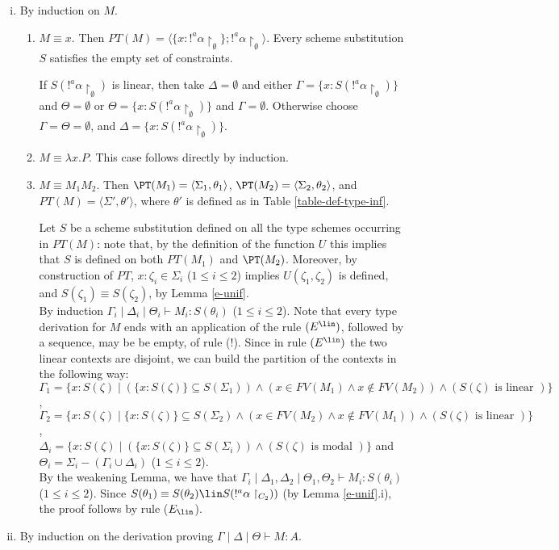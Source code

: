 \proof\hfill
\begin{enumerate}[i)] 
\item By induction on $M$.
\begin{enumerate}[$\bullet$]
\item $M \equiv x$. Then $PT(M)=\langle\{x:!^a \alpha\restriction_{\emptyset}\};
!^a \alpha\restriction_{\emptyset}\rangle$.
Every scheme substitution $S$ satisfies the empty set of constraints. 

If 
$S(!^a \alpha\restriction_{\emptyset})$ is linear, then
take $\Delta=\emptyset$ and either $\Gamma =\{x:S(!^a \alpha\restriction_{\emptyset})\}$ 
and $\Theta = \emptyset$ 
or $\Theta = \{x:S(!^a \alpha\restriction_{\emptyset})\}$ and $\Gamma =\emptyset$. 
Otherwise choose 
$\Gamma =\Theta =\emptyset$, and $\Delta=\{x:S(!^a \alpha\restriction_{\emptyset})\}$.
\item $M \equiv \lambda x.P$. This case follows directly by induction.
\item $M\equiv M_{1}M_{2}$. 
Then $\PT(M_1) = \langle \Sigma_1, \theta_{1}\rangle$, 
$\PT(M_2) = \langle \Sigma_2, \theta_{2}\rangle$, and 
$PT(M)=\langle \Sigma',\theta' \rangle $,
where $\theta' $ is defined as in Table \ref{table-def-type-inf}.

Let $S$ be a scheme substitution defined on all the type schemes occurring in $PT(M)$:
note that, by the definition of the function $U$ this implies that $S$ is defined on both $PT(M_{1})$
and $\PT(M_2)$. Moreover, by construction of $PT$, $x:\zeta_{i} \in \Sigma_{i}$ ($1 \leq i \leq 2$)
implies $U(\zeta_{1},\zeta_{2})$ is defined, and $S(\zeta_{1})\equiv S(\zeta_{2})$,
by Lemma \ref{e-unif}.\\
By induction 
$\Gamma_{i} \mid \Delta_{i} \mid \Theta_{i}\vdash M_{i}:S(\theta_{i})$
($1 \leq i \leq 2$). Note that every type derivation for $M$ ends with an application of the rule $(E^{\lin})$, followed by a sequence, 
may be be empty, of rule ($!$). Since in rule $(E^{\lin})$ the two linear contexts are disjoint, we can build the partition of the contexts in
the following way:\\
$\Gamma_{1}=\{x:S(\zeta) \mid (\{x:S(\zeta)\}\subseteq S(\Sigma_{1})) \wedge
(x\in FV(M_{1}) \wedge x\not \in FV(M_{2})) \wedge
(S(\zeta) \mbox{ is linear })\}$,\\
$\Gamma_{2}=\{x:S(\zeta) \mid \{x:S(\zeta)\}\subseteq S(\Sigma_{2}) 
\wedge (x\in FV(M_{2}) \wedge x\not \in FV(M_{1})) \wedge
(S(\zeta) \mbox{ is linear })\}$,\\
$\Delta_{i}=\{x:S(\zeta) \mid (\{x:S(\zeta)\}\subseteq S(\Sigma_{i}))  \wedge
(S(\zeta) \mbox{ is modal })\}$ and\\
$\Theta_{i}=\Sigma_{i}-(\Gamma_{i} \cup \Delta_{i})  $ ($1 \leq i \leq 2$).\\
 By the weakening Lemma, we have that 
$\Gamma_{i} \mid \Delta_{1},\Delta_{2} \mid \Theta_{1},\Theta_{2}
\vdash M_{i}:S(\theta_{i})$ ($1 \leq i \leq 2$). 
Since $S(\theta_{1})\equiv S(\theta_{2})\lin
S(!^{a}\alpha\restriction_{C_{2}}))$ (by Lemma \ref{e-unif}.i), 
the proof follows by rule ($E_{\lin}$).
\end{enumerate}
\item By induction on the derivation proving $\Gamma \mid \Delta \mid \Theta \vdash M: A$.


\end{enumerate}
